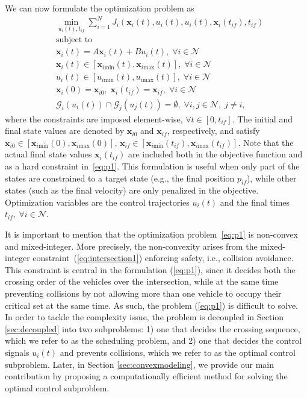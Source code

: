 \documentclass[letterpaper,10pt,conference]{ieeeconf}
\begin{document}
We can now formulate the optimization problem as
{\allowdisplaybreaks
\begin{subequations} \label{eq:p1}
\begin{align}
&\min_{u_i(t), t_{if}} \sum_{i=1}^N J_i(\mathbf{x}_i(t),u_i(t),\dot u_i(t), \mathbf{x}_i(t_{if}), t_{if}) \label{eq:objective1}\\
&\text{subject to} \nonumber\\
&\mathbf{\dot x}_i(t)=A \mathbf{x}_i(t)+ B u_i(t), \; \forall i \in \mathcal{N}\\
&\mathbf{x}_i(t) \in [\mathbf{x}_{i\text{min}}(t), \mathbf{x}_{i\text{max}}(t)], \; \forall i \in \mathcal{N}\\
&u_i(t) \in [u_{i\text{min}}(t), u_{i\text{max}}(t)], \; \forall i \in \mathcal{N}\\
&\mathbf{x}_i(0)=\mathbf{x}_{i0}, \; \mathbf{x}_i(t_{if})=\mathbf{x}_{if}, \; \forall i \in \mathcal{N}\\
&\mathcal{G}_i(u_i(t)) \cap  \mathcal{G}_j(u_j(t))=\emptyset, \; \forall i,j \in \mathcal{N}, \; j \neq i, \label{eq:intersection1}
\end{align}
\end{subequations}}%
where the constraints are imposed element-wise, \mbox{$\forall t \in [0, t_{if}]$}. The initial and final state values are denoted by $\mathbf{x}_{i0}$ and $\mathbf{x}_{if}$, respectively, and satisfy \mbox{$\mathbf{x}_{i0} \in [\mathbf{x}_{i\text{min}}(0), \mathbf{x}_{i\text{max}}(0)]$}, \mbox{$\mathbf{x}_{if} \in [\mathbf{x}_{i\text{min}}(t_{if}), \mathbf{x}_{i\text{max}}(t_{if})]$}. Note that the actual final state values $\mathbf{x}_i(t_{if})$ are included both in the objective function and as a hard constraint in~\eqref{eq:p1}. This formulation is useful when only part of the states are constrained to a target state (e.g., the final position $p_{if}$), while other states (such as the final velocity) are only penalized in the objective. Optimization variables are the control trajectories $u_i(t)$ and the final times~$t_{if},\ \forall i \in \mathcal{N}$.

It is important to mention that the optimization problem~\eqref{eq:p1} is non-convex and mixed-integer. More precisely, the non-convexity arises from the mixed-integer constraint~(\ref{eq:intersection1}) enforcing safety, i.e., collision avoidance. This constraint is central in the formulation (\ref{eq:p1}), since it decides both the crossing order of the vehicles over the intersection, while at the same time preventing collisions by not allowing more than one vehicle to occupy their critical set at the same time. As such, the problem (\ref{eq:p1}) is difficult to solve. In order to tackle the complexity issue, the problem is decoupled in Section \ref{sec:decoupled} into two subproblems: 1) one that decides the crossing sequence, which we refer to as the scheduling problem, and 2) one that decides the control signals $u_i(t)$ and prevents collisions, which we refer to as the optimal control subproblem. Later, in Section \ref{sec:convexmodeling}, we provide our main contribution by proposing a computationally efficient method for solving the optimal control subproblem.
\end{document}
